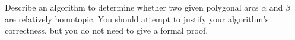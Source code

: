 \documentclass[11pt]{article}
\begin{document}
Describe an algorithm to determine whether two given polygonal arcs \(\alpha\) and \(\beta\) are relatively homotopic. You should attempt to justify your algorithm’s correctness, but you do not need to give a formal proof.

\begin{solution}\(\)\par



\end{solution}
\end{document}
